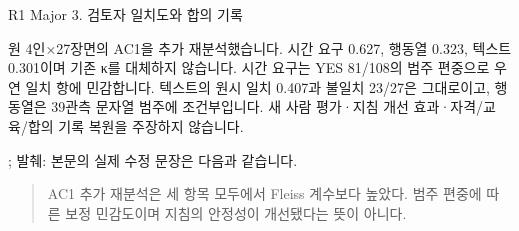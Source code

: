 \begin{reviewitem}{R1 Major 3. 검토자 일치도와 합의 기록}
\begin{authorresponse}
원 4인×27장면의 AC1을 추가 재분석했습니다. 시간 요구 0.627, 행동열 0.323, 텍스트 0.301이며 기존 κ를 대체하지 않습니다. 시간 요구는 YES 81/108의 범주 편중으로 우연 일치 항에 민감합니다. 텍스트의 원시 일치 0.407과 불일치 23/27은 그대로이고, 행동열은 39관측 문자열 범주에 조건부입니다. 새 사람 평가·지침 개선 효과·자격/교육/합의 기록 복원을 주장하지 않습니다.

\end{authorresponse}

\begin{manuscriptrevision}{; 발췌: }
본문의 실제 수정 문장은 다음과 같습니다.

\begin{quote}
AC1 추가 재분석은 세 항목 모두에서 Fleiss 계수보다 높았다. 범주 편중에 따른 보정 민감도이며 지침의 안정성이 개선됐다는 뜻이 아니다.
\end{quote}
\end{manuscriptrevision}

\end{reviewitem}

\clearpage

